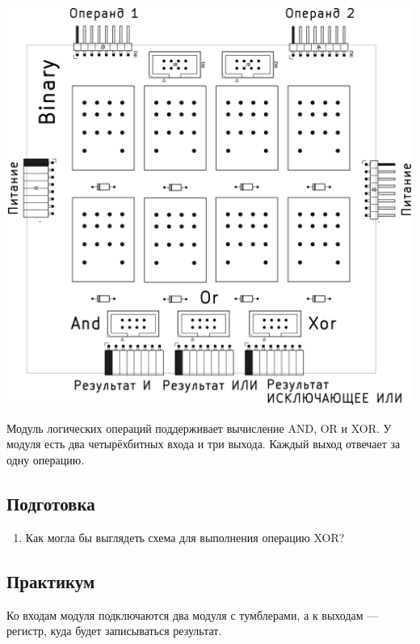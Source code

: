 \begin{center}
\includegraphics{boards/logic_binary.png}
\end{center}

Модуль логических операций поддерживает вычисление AND, OR и XOR.
У модуля есть два четырёхбитных входа и три выхода.
Каждый выход отвечает за одну операцию.

\subsection{Подготовка}

\begin{enumerate}
    \item Как могла бы выглядеть схема для выполнения операцию XOR?
\end{enumerate}

\subsection{Практикум}

Ко входам модуля подключаются два модуля с тумблерами, а к выходам --- регистр,
куда будет записываться результат.


